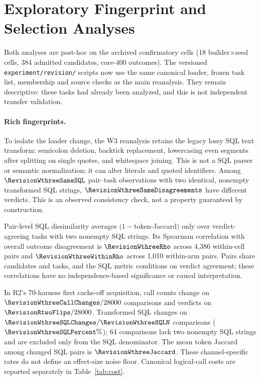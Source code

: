 \begin{table}[t]
\centering\small

\caption{Descriptive canonical cost audit on core-400, 18 cells per arm.
Logged logical calls are not billable requests or token counts. The last
column averages candidate-population calls per task over cells.}
\label{tab:cost}
\end{table}

\section{Exploratory Fingerprint and Selection Analyses}\label{app:rich}
Both analyses are post-hoc on the archived confirmatory cells (18
builder$\times$seed cells, 384 admitted candidates, core-400 outcomes).
The versioned \texttt{experiment/revision/} scripts now use the same
canonical loader, frozen task list, membership and source checks as the
main reanalysis. They remain descriptive: these tasks had already been
analyzed, and this is not independent transfer validation.

\paragraph{Rich fingerprints.} To isolate the loader change, the W3
reanalysis retains the legacy lossy SQL text transform: semicolon deletion,
backtick replacement, lowercasing even segments after splitting on single
quotes, and whitespace joining. This is not a SQL parser or semantic
normalization; it can alter literals and quoted identifiers. Among
$\RevisionWthreeSameSQL$ pair--task observations with two identical,
nonempty transformed SQL strings, $\RevisionWthreeSameDisagreements$
have different verdicts. This is an observed consistency check, not a
property guaranteed by construction.

Pair-level SQL dissimilarity averages $(1-$token-Jaccard$)$ only over
verdict-agreeing tasks with two nonempty SQL strings. Its Spearman
correlation with overall outcome disagreement is $\RevisionWthreeRho$
across 4{,}386 within-cell pairs and $\RevisionWthreeWithinRho$ across
1{,}010 within-arm pairs. Pairs share candidates and tasks, and the SQL
metric conditions on verdict agreement; these correlations have no
independence-based significance or causal interpretation.

In R2's 70-harness first cache-off acquisition, call counts change on
$\RevisionWthreeCallChanges/28000$ comparisons and verdicts on
$\RevisionRtwoFlips/28000$. Transformed SQL changes on
$\RevisionWthreeSQLChanges/\RevisionWthreeSQLN$ comparisons
($\RevisionWthreeSQLPercent\%$); 64 comparisons lack two nonempty SQL
strings and are excluded only from the SQL denominator. The mean token
Jaccard among changed SQL pairs is $\RevisionWthreeJaccard$. These
channel-specific rates do not define an effect-size noise floor.
Canonical logical-call costs are reported separately in Table~\ref{tab:cost}.

